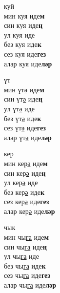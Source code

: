 \begin{multicols}{4}
\begin{enumerate}
\begin{minipage}{\linewidth}
    \item
    куй\\
    мин куя иде\textbf{м}\\
    син куя иде\textbf{ң}\\
    ул куя иде\\
    без куя иде\textbf{к}\\
    сез куя иде\textbf{гез}\\
    алар куя иде\textbf{ләр}\\
\end{minipage}

\begin{minipage}{\linewidth}
    \item
    үт\\
    мин үт\underline{ә} иде\textbf{м}\\
    син үт\underline{ә} иде\textbf{ң}\\
    ул үт\underline{ә} иде\\
    без үт\underline{ә} иде\textbf{к}\\
    сез үт\underline{ә} иде\textbf{гез}\\
    алар үт\underline{ә} иде\textbf{ләр}\\
\end{minipage}

\begin{minipage}{\linewidth}
    \item
    кер\\
    мин кер\underline{ә} иде\textbf{м}\\
    син кер\underline{ә} иде\textbf{ң}\\
    ул кер\underline{ә} иде\\
    без кер\underline{ә} иде\textbf{к}\\
    сез кер\underline{ә} иде\textbf{гез}\\
    алар кер\underline{ә} иде\textbf{ләр}\\
\end{minipage}

\begin{minipage}{\linewidth}
    \item
    чык\\
    мин чы\underline{га} иде\textbf{м}\\
    син чы\underline{га} иде\textbf{ң}\\
    ул чы\underline{га} иде\\
    без чы\underline{га} иде\textbf{к}\\
    сез чы\underline{га} иде\textbf{гез}\\
    алар чы\underline{га} иде\textbf{ләр}\\
\end{minipage}


\end{enumerate}
\end{multicols}
